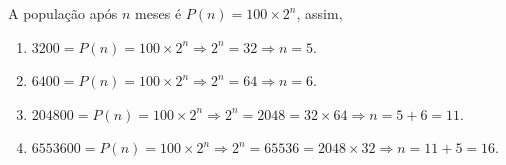 \documentclass[10 pt,usenames,dvipsnames, oneside]{article}
\begin{document}
\ifdefined\prof
\begin{solucao}

	A população após $n$ meses é $P(n) = 100 \times 2^n$, assim,
	\begin{enumerate}[label = \alph*)]
	\item $3200 = P(n) = 100 \times 2^n \Rightarrow 2^n = 32 \Rightarrow n=5$.
	\item $6400 = P(n) = 100 \times 2^n \Rightarrow 2^n = 64 \Rightarrow n=6$.
	\item $204800 = P(n) = 100 \times 2^n \Rightarrow 2^n = 2048 = 32 \times 64 \Rightarrow n=5+6=11$.
	\item $6553600 = P(n) = 100 \times 2^n \Rightarrow 2^n = 65536 = 2048 \times 32 \Rightarrow n=11+5=16$.
	\end{enumerate}

\end{solucao}
\fi
\end{document}
